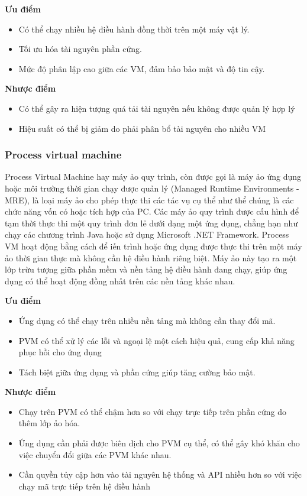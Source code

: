 \documentclass[a4paper,12pt]{article}
\begin{document}
\textbf{Ưu điểm}
\begin{itemize}
\item Có thể chạy nhiều hệ điều hành đồng thời trên một máy vật lý.
\item Tối ưu hóa tài nguyên phần cứng.
\item Mức độ phân lập cao giữa các VM, đảm bảo bảo mật và độ tin cậy.
\end{itemize}

\textbf{Nhược điểm} 
\begin{itemize}
\item Có thể gây ra hiện tượng quá tải tài nguyên nếu không được quản lý hợp lý
\item Hiệu suất có thể bị giảm do phải phân bổ tài nguyên cho nhiều VM
\end{itemize}


\subsubsection{ Process virtual machine }
Process Virtual Machine hay máy ảo quy trình, còn được gọi là máy ảo ứng dụng hoặc môi trường thời gian chạy
được quản lý (Managed Runtime Environments - MRE), là loại máy ảo cho phép thực thi các tác vụ cụ thể như thể
chúng là các chức năng vốn có hoặc tích hợp của PC. Các máy ảo quy trình được cấu hình để tạm thời thực thi một
quy trình đơn lẻ dưới dạng một ứng dụng, chẳng hạn như chạy các chương trình Java hoặc sử dụng Microsoft .NET
Framework. Process VM hoạt động bằng cách để iến trình hoặc ứng dụng được thực thi trên một máy ảo thời gian thực mà không cần hệ điều hành riêng biệt. Máy ảo này tạo ra một lớp trừu tượng giữa phần mềm và nền tảng hệ điều hành đang chạy, giúp ứng dụng có thể hoạt động đồng nhất trên các nền tảng khác nhau.


\textbf{Ưu điểm}
\begin{itemize}
\item Ứng dụng có thể chạy trên nhiều nền tảng mà không cần thay đổi mã.
\item PVM có thể xử lý các lỗi và ngoại lệ một cách hiệu quả, cung cấp khả năng phục hồi cho ứng dụng
\item Tách biệt giữa ứng dụng và phần cứng giúp tăng cường bảo mật.
\end{itemize}

\textbf{Nhược điểm} 
\begin{itemize}
\item Chạy trên PVM có thể chậm hơn so với chạy trực tiếp trên phần cứng do thêm lớp ảo hóa.
\item Ứng dụng cần phải được biên dịch cho PVM cụ thể, có thể gây khó khăn cho việc chuyển đổi giữa các PVM khác nhau.
\item Cần quyền tủy cập hơn vào tài nguyên hệ thống và API nhiều hơn so với việc chạy mã trực tiếp trên hệ điều hành 
\end{itemize}
\end{document}

